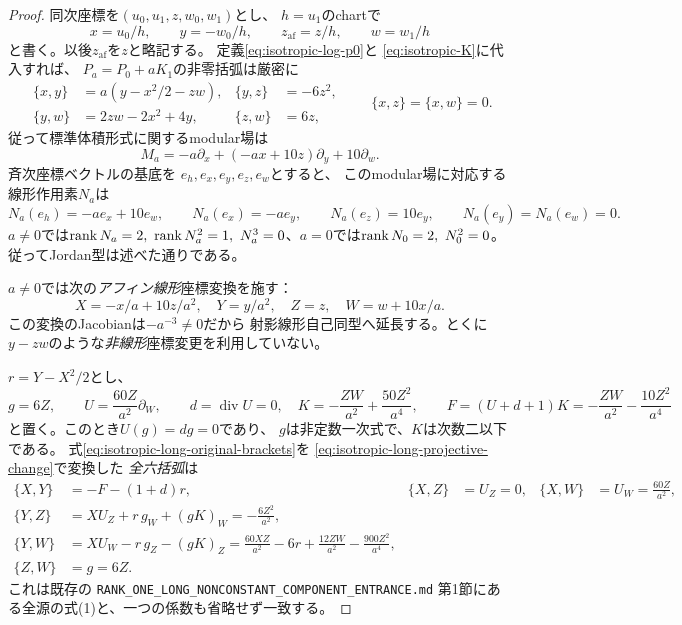 \begin{proof}
同次座標を\((u_0,u_1,z,w_0,w_1)\)とし、
\(h=u_1\)のchartで
\[
 x=u_0/h,\qquad y=-w_0/h,\qquad
 z_{\mathrm{af}}=z/h,\qquad w=w_1/h
\]
と書く。以後\(z_{\mathrm{af}}\)を\(z\)と略記する。
定義\eqref{eq:isotropic-log-p0}と
\eqref{eq:isotropic-K}に代入すれば、
\(P_a=P_0+aK_1\)の非零括弧は厳密に
\begin{equation}\label{eq:isotropic-long-original-brackets}
\begin{aligned}
\{x,y\}&=a(y-x^2/2-zw),&
\{y,z\}&=-6z^2,\\
\{y,w\}&=2zw-2x^2+4y,&
\{z,w\}&=6z,
\end{aligned}
\qquad \{x,z\}=\{x,w\}=0.
\end{equation}
従って標準体積形式に関するmodular場は
\[
 M_a=-a\partial_x+(-ax+10z)\partial_y+10\partial_w.
\]
斉次座標ベクトルの基底を
\(e_h,e_x,e_y,e_z,e_w\)とすると、
このmodular場に対応する線形作用素\(N_a\)は
\[
 N_a(e_h)=-ae_x+10e_w,\qquad
 N_a(e_x)=-ae_y,\qquad
 N_a(e_z)=10e_y,\qquad N_a(e_y)=N_a(e_w)=0.
\]
\(a\ne0\)では\(\operatorname{rank} N_a=2,\ \operatorname{rank} N_a^2=1,\
N_a^3=0\)、\(a=0\)では\(\operatorname{rank} N_0=2,\ N_0^2=0\)。
従ってJordan型は述べた通りである。

\(a\ne0\)では次の\emph{アフィン線形}座標変換を施す：
\begin{equation}\label{eq:isotropic-long-projective-change}
 X=-x/a+10z/a^2,\quad Y=y/a^2,\quad
 Z=z,\quad W=w+10x/a.
\end{equation}
この変換のJacobianは\(-a^{-3}\ne0\)だから
射影線形自己同型へ延長する。とくに
\(y-zw\)のような\emph{非線形}座標変更を利用していない。

\(r=Y-X^2/2\)とし、
\[
 g=6Z,\qquad
 U=\frac{60Z}{a^2}\partial_W,\qquad d=\operatorname{div}U=0,
\quad
 K=-\frac{ZW}{a^2}+\frac{50Z^2}{a^4},\qquad
 F=(U+d+1)K=-\frac{ZW}{a^2}-\frac{10Z^2}{a^4}
\]
と置く。このとき\(U(g)=dg=0\)であり、
\(g\)は非定数一次式で、\(K\)は次数二以下である。
式\eqref{eq:isotropic-long-original-brackets}を
\eqref{eq:isotropic-long-projective-change}で変換した
\emph{全六括弧}は
\begin{equation}\label{eq:isotropic-long-source-brackets}
\begin{aligned}
 \{X,Y\}&=-F-(1+d)r,&
 \{X,Z\}&=U_Z=0,&
 \{X,W\}&=U_W=\frac{60Z}{a^2},\\
 \{Y,Z\}&=XU_Z+r\,g_W+(gK)_W=-\frac{6Z^2}{a^2},\\
 \{Y,W\}&=XU_W-r\,g_Z-(gK)_Z
   =\frac{60XZ}{a^2}-6r+\frac{12ZW}{a^2}
      -\frac{900Z^2}{a^4},\\
 \{Z,W\}&=g=6Z .
\end{aligned}
\end{equation}
これは既存の
\texttt{RANK\_ONE\_LONG\_NONCONSTANT\_COMPONENT\_ENTRANCE.md}
第1節にある全源の式(1)と、一つの係数も省略せず一致する。


\end{proof}
